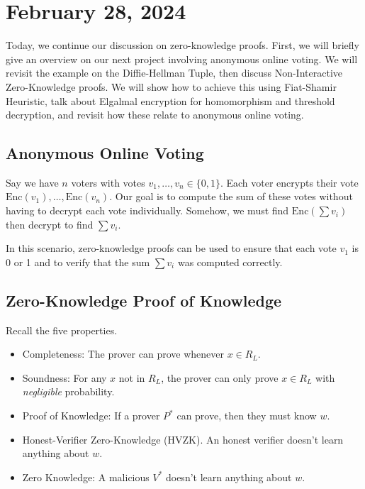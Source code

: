 \section{February 28, 2024}
\label{20240228}

Today, we continue our discussion on zero-knowledge proofs. First, we will briefly give an overview on our next project involving anonymous online voting. We will revisit the example on the Diffie-Hellman Tuple, then discuss Non-Interactive Zero-Knowledge proofs. We will show how to achieve this using Fiat-Shamir Heuristic, talk about Elgalmal encryption for homomorphism and threshold decryption, and revisit how these relate to anonymous online voting.

\subsection{Anonymous Online Voting}

Say we have $n$ voters with votes $v_1, \dots, v_n \in \{ 0, 1\}$. Each voter encrypts their vote $\text{Enc}(v_1), \dots, \text{Enc}(v_n)$. Our goal is to compute the sum of these votes without having to decrypt each vote individually. Somehow, we must find $\text{Enc}(\sum v_i)$ then decrypt to find $\sum v_i$.

In this scenario, zero-knowledge proofs can be used to ensure that each vote $v_1$ is 0 or 1 and to verify that the sum $\sum v_i$ was computed correctly.

\subsection{Zero-Knowledge Proof of Knowledge}

Recall the five properties.

\begin{itemize}
    \item Completeness: The prover can prove whenever $x\in R_L$.
    \item Soundness: For any $x$ not in $R_L$, the prover can only prove $x\in R_L$ with \emph{negligible} probability.
    \item Proof of Knowledge: If a prover $P^*$ can prove, then they must know $w$.
    \item Honest-Verifier Zero-Knowledge (HVZK). An honest verifier doesn't learn anything about $w$.
    \item Zero Knowledge: A malicious $V^*$ doesn't learn anything about $w$.
\end{itemize}

